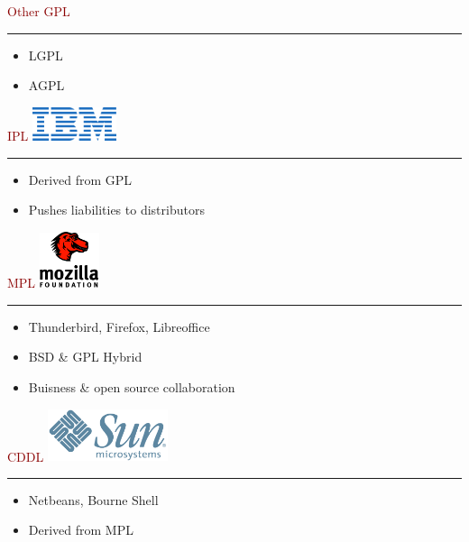 \documentclass[c]{beamer}
\newcommand{\TITLE}{\fontsize{50pt}{1em}\selectfont}
\begin{document}
  \begin{frame}
    \textcolor{darkred}{{\TITLE Other GPL  \\}}
    \vspace{1em} \hrule \vspace{1em}
    \LARGE
    \begin{itemize}
      \item LGPL
      \item AGPL
    \end{itemize}
  \end{frame}

  \begin{frame}
    \textcolor{darkred}{{\TITLE IPL}}
    \hfill \includegraphics[width=70pt]{ibm} \\
    \vspace{1em} \hrule \vspace{1em}
    \LARGE
    \begin{itemize}
      \item Derived from GPL
      \item Pushes liabilities to distributors
    \end{itemize}
  \end{frame}

  \begin{frame}
    \textcolor{darkred}{{\TITLE MPL}}
    \hfill \includegraphics[width=50pt]{mozilla} \\
    \vspace{1em} \hrule \vspace{1em}
    \LARGE
    \begin{itemize}
    \item Thunderbird, Firefox, Libreoffice
    \item BSD \& GPL Hybrid \\
    \item Buisness \& open source collaboration
    \end{itemize}
  \end{frame}

  \begin{frame}
    \textcolor{darkred}{{\TITLE CDDL}}
    \hfill \includegraphics[width=100pt]{sun} \\
    \vspace{1em} \hrule \vspace{1em}
    \LARGE
    \begin{itemize}
    \item Netbeans, Bourne Shell
    \item Derived from MPL
    \end{itemize}
  \end{frame}
\end{document}
